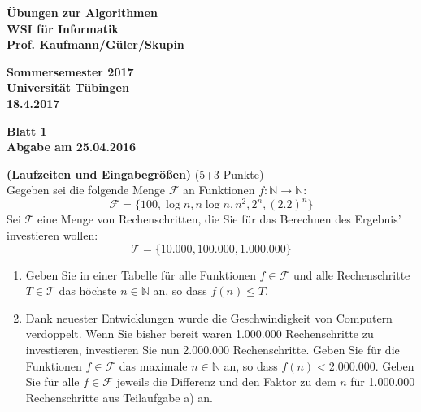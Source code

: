\documentclass{article}
\begin{document}
\noindent
\begin{minipage}[t]{0.6\textwidth}
\begin{flushleft}
\bf \"Ubungen zur Algorithmen\\
WSI f\"ur Informatik\\
Prof. Kaufmann/G\"uler/Skupin
\end{flushleft}
\end{minipage}
\begin{minipage}[t]{0.4\textwidth}
\begin{flushright}
\bf Sommersemester 2017\\
Universit\"at T\"ubingen\\
18.4.2017
\end{flushright}
\end{minipage}

\setlength{\parindent}{0pt}
\setlength{\parskip}{6pt}

\renewcommand{\labelenumi}{\alph{enumi})}

\vspace*{1cm}

\begin{center}

\textbf{ \Large  Blatt 1} \\ 
\textbf{Abgabe am 25.04.2016}

\end{center}

\vskip 0.5cm

  \quad\textbf{(Laufzeiten und Eingabegrö{\ss}en)} \quad(5+3 Punkte)\\

\noindent
Gegeben sei die folgende Menge $\mathcal F$ an Funktionen $f \colon \mathbb N \rightarrow \mathbb N$:
\[
\mathcal F = \{100, \log n, n \log n, n^2, 2^n, (2.2)^n\}
\]
Sei $\mathcal T$ eine Menge von Rechenschritten, die Sie für das Berechnen des Ergebnis' investieren wollen:
\[
\mathcal T = \{10.000, 100.000, 1.000.000\}
\]
\begin{enumerate}
\item Geben Sie in einer Tabelle für alle Funktionen $f\in \mathcal F$ und alle Rechenschritte $T \in \mathcal T$ das höchste $n \in \mathbb N$ an, so dass $f(n) \leq T$.
\item Dank neuester Entwicklungen wurde die Geschwindigkeit von Computern verdoppelt. Wenn Sie bisher bereit waren 1.000.000 Rechenschritte zu investieren, investieren Sie nun 2.000.000 Rechenschritte. Geben Sie für die Funktionen $f\in \mathcal F$ das maximale $n \in \mathbb N$ an, so dass $f(n)<2.000.000$.
Geben Sie für alle $f \in \mathcal F$ jeweils die Differenz und den Faktor zu dem $n$ für 1.000.000 Rechenschritte aus Teilaufgabe a) an.

\end{enumerate}
\end{document}
